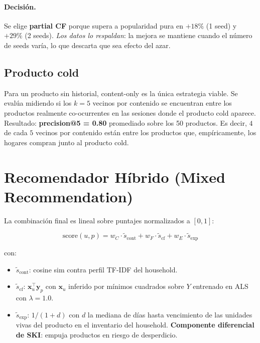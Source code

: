 \documentclass[12pt,a4paper]{article}
\newcommand{\metric}[1]{\textcolor{metricblue}{\textbf{#1}}}
\newcommand{\winner}[1]{\textcolor{successgreen}{\textbf{#1}}}
\begin{document}
\paragraph{Decisión.} Se elige \winner{partial CF} porque supera a popularidad pura en $+18\%$ (1 seed) y $+29\%$ (2 seeds). \emph{Los datos lo respaldan}: la mejora se mantiene cuando el número de seeds varía, lo que descarta que sea efecto del azar.

\subsection{Producto cold}

Para un producto sin historial, content-only es la única estrategia viable. Se evalúa midiendo si los $k=5$ vecinos por contenido se encuentran entre los productos realmente co-ocurrentes en las sesiones donde el producto cold aparece. Resultado: \metric{precision@5 = 0.80} promediado sobre los 50 productos. Es decir, $4$ de cada $5$ vecinos por contenido están entre los productos que, empíricamente, los hogares compran junto al producto cold.

\section{Recomendador Híbrido (Mixed Recommendation)}
\label{sec:hybrid}

La combinación final es lineal sobre puntajes normalizados a $[0, 1]$:

\begin{equation}
\text{score}(u, p) = w_C \cdot \tilde s_{\text{cont}} + w_F \cdot \tilde s_{\text{cf}} + w_E \cdot \tilde s_{\text{exp}}
\label{eq:hyb}
\end{equation}

con:
\begin{itemize}
    \item $\tilde s_{\text{cont}}$: cosine sim contra perfil TF-IDF del household.
    \item $\tilde s_{\text{cf}}$: $\mathbf{x}_u^\top \mathbf{y}_p$ con $\mathbf{x}_u$ inferido por mínimos cuadrados sobre $Y$ entrenado en ALS con $\lambda = 1.0$.
    \item $\tilde s_{\text{exp}}$: $1 / (1 + d)$ con $d$ la mediana de días hasta vencimiento de las unidades vivas del producto en el inventario del household. \textbf{Componente diferencial de SKI}: empuja productos en riesgo de desperdicio.
\end{itemize}
\end{document}
